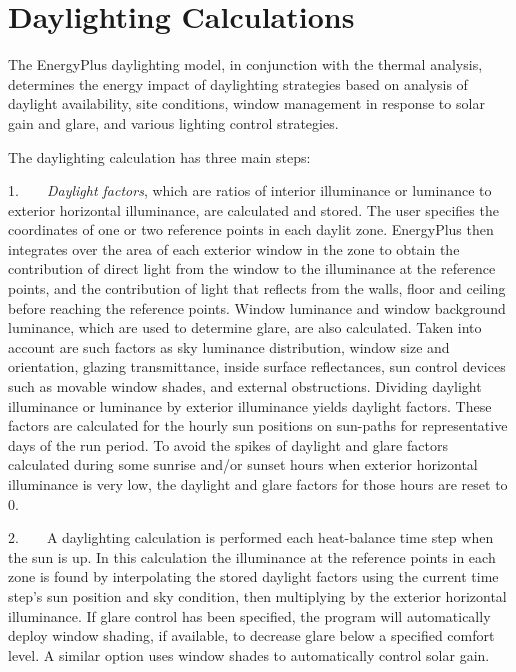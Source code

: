 \section{Daylighting Calculations}\label{daylighting-calculations}

The EnergyPlus daylighting model, in conjunction with the thermal analysis, determines the energy impact of daylighting strategies based on analysis of daylight availability, site conditions, window management in response to solar gain and glare, and various lighting control strategies.

The daylighting calculation has three main steps:

1.~~~~\emph{Daylight factors}, which are ratios of interior illuminance or luminance to exterior horizontal illuminance, are calculated and stored. The user specifies the coordinates of one or two reference points in each daylit zone. EnergyPlus then integrates over the area of each exterior window in the zone to obtain the contribution of direct light from the window to the illuminance at the reference points, and the contribution of light that reflects from the walls, floor and ceiling before reaching the reference points. Window luminance and window background luminance, which are used to determine glare, are also calculated. Taken into account are such factors as sky luminance distribution, window size and orientation, glazing transmittance, inside surface reflectances, sun control devices such as movable window shades, and external obstructions. Dividing daylight illuminance or luminance by exterior illuminance yields daylight factors. These factors are calculated for the hourly sun positions on sun-paths for representative days of the run period. To avoid the spikes of daylight and glare factors calculated during some sunrise and/or sunset hours when exterior horizontal illuminance is very low, the daylight and glare factors for those hours are reset to 0.

2.~~~~A daylighting calculation is performed each heat-balance time step when the sun is up. In this calculation the illuminance at the reference points in each zone is found by interpolating the stored daylight factors using the current time step's sun position and sky condition, then multiplying by the exterior horizontal illuminance. If glare control has been specified, the program will automatically deploy window shading, if available, to decrease glare below a specified comfort level. A similar option uses window shades to automatically control solar gain.

